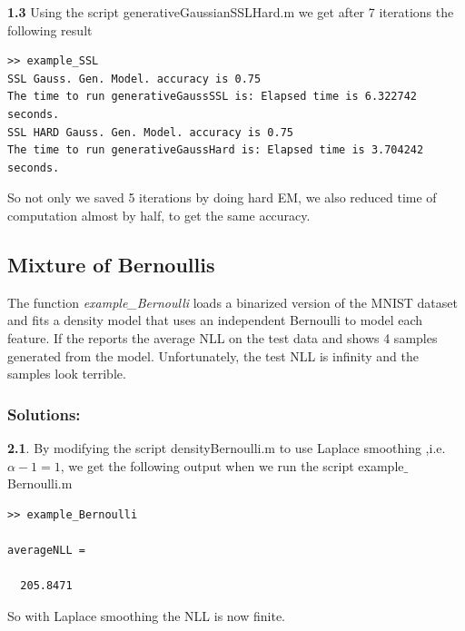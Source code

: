 \documentclass{article}
\begin{document}
\textbf{1.3}
\newline
Using the script generativeGaussianSSLHard.m we get after 7 iterations the following result
\begin{verbatim}
>> example_SSL      
SSL Gauss. Gen. Model. accuracy is 0.75
The time to run generativeGaussSSL is: Elapsed time is 6.322742 seconds.
SSL HARD Gauss. Gen. Model. accuracy is 0.75
The time to run generativeGaussHard is: Elapsed time is 3.704242 seconds.
\end{verbatim}
So not only we saved 5 iterations by doing hard EM, we also reduced time of computation almost by half, to get the same accuracy.


\newpage


\subsection{Mixture of Bernoullis}

The function \emph{example\_Bernoulli} loads a binarized version of the MNIST dataset and fits a density model that uses an independent Bernoulli to model each feature. If the reports the average NLL on the test data and shows 4 samples generated from the model. Unfortunately, the test NLL is infinity and the samples look terrible.
\newpage
\subsubsection*{Solutions:}
\textbf{2.1}.
\newline
By modifying the script densityBernoulli.m to use Laplace smoothing ,i.e.  $\alpha-1=1$, we get the following output when we run the script example$\_$Bernoulli.m
\begin{verbatim}
>> example_Bernoulli

averageNLL =

  205.8471
\end{verbatim}
So with Laplace smoothing the NLL is now finite.
\newline
\end{document}
